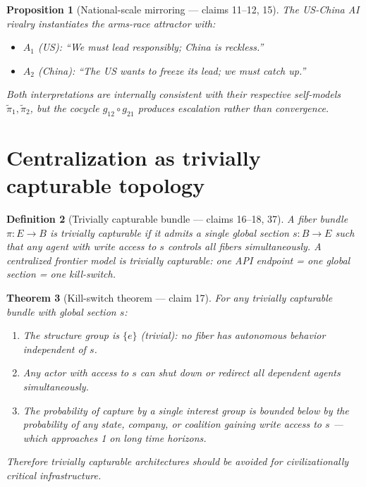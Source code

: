 \documentclass[11pt,a4paper]{article}
\newtheorem{definition}{Definition}[section]
\newtheorem{theorem}[definition]{Theorem}
\newtheorem{proposition}[definition]{Proposition}
\begin{document}
\begin{proposition}[National-scale mirroring --- claims 11--12, 15]
The US-China AI rivalry instantiates the arms-race attractor with:
\begin{itemize}
\item $A_1$ (US): ``We must lead responsibly; China is reckless.''
\item $A_2$ (China): ``The US wants to freeze its lead; we must catch up.''
\end{itemize}
Both interpretations are internally consistent with their respective
self-models $\tilde{\pi}_1, \tilde{\pi}_2$, but the cocycle
$g_{12} \circ g_{21}$ produces escalation rather than convergence.
\end{proposition}

\section{Centralization as trivially capturable topology}
\label{sec:kill-switch}

\begin{definition}[Trivially capturable bundle --- claims 16--18, 37]
\label{def:capturable}
A fiber bundle $\pi : E \to B$ is \emph{trivially capturable} if it admits
a single global section $s : B \to E$ such that any agent with write access
to $s$ controls all fibers simultaneously. A centralized frontier model is
trivially capturable: one API endpoint = one global section = one kill-switch.
\end{definition}

\begin{theorem}[Kill-switch theorem --- claim 17]
\label{thm:kill-switch}
For any trivially capturable bundle with global section $s$:
\begin{enumerate}
\item The structure group is $\{e\}$ (trivial): no fiber has autonomous
  behavior independent of $s$.
\item Any actor with access to $s$ can shut down or redirect all dependent
  agents simultaneously.
\item The probability of capture by a single interest group is bounded below
  by the probability of \emph{any} state, company, or coalition gaining
  write access to $s$ --- which approaches 1 on long time horizons.
\end{enumerate}
Therefore trivially capturable architectures should be avoided for
civilizationally critical infrastructure.
\end{theorem}
\end{document}
